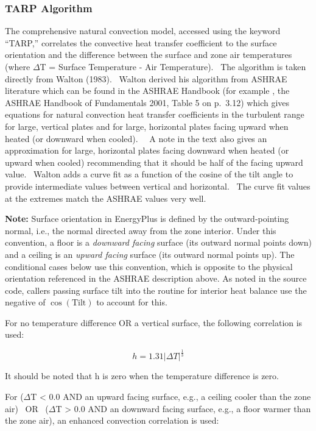 \subsubsection{TARP Algorithm}\label{tarp-algorithm}

The comprehensive natural convection model, accessed using the keyword ``TARP,'' correlates the convective heat transfer coefficient to the surface orientation and the difference between the surface and zone air temperatures (where $\Delta$T = Surface Temperature - Air Temperature).~ The algorithm is taken directly from Walton (1983).~ Walton derived his algorithm from ASHRAE literature which can be found in the ASHRAE Handbook (for example , the  ASHRAE Handbook of Fundamentals 2001, Table 5 on p.~3.12) which gives equations for natural convection heat transfer coefficients in the turbulent range for large, vertical plates and for large, horizontal plates facing upward when heated (or downward when cooled).~~ A note in the text also gives an approximation for large, horizontal plates facing downward when heated (or upward when cooled) recommending that it should be half of the facing upward value.~ Walton adds a curve fit as a function of the cosine of the tilt angle to provide intermediate values between vertical and horizontal.~ The curve fit values at the extremes match the ASHRAE values very well.

\textbf{Note:} Surface orientation in EnergyPlus is defined by the outward-pointing normal, i.e., the normal directed away from the zone interior. Under this convention, a floor is a \emph{downward facing} surface (its outward normal points down) and a ceiling is an \emph{upward facing} surface (its outward normal points up). The conditional cases below use this convention, which is opposite to the physical orientation referenced in the ASHRAE description above. As noted in the source code, callers passing surface tilt into the routine for interior heat balance use the negative of $\cos(\text{Tilt})$ to account for this.

For no temperature difference OR a vertical surface, the following correlation is used:

\begin{equation}
h = 1.31{\left| {\Delta T} \right|^{\frac{1}{3}}}
\end{equation}

It should be noted that h is zero when the temperature difference is zero.

For ($\Delta$T \textless{} 0.0 AND an upward facing surface, e.g., a ceiling cooler than the zone air)~ OR~ ($\Delta$T \textgreater{} 0.0 AND an downward facing surface, e.g., a floor warmer than the zone air), an enhanced convection correlation is used:

